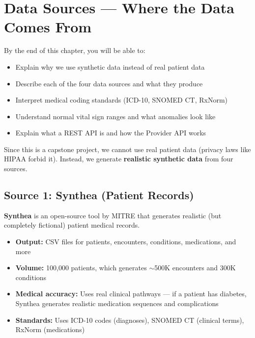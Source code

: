 \documentclass[12pt, a4paper, oneside]{report}
\begin{document}
\chapter{Data Sources --- Where the Data Comes From}
\label{ch:datasources}

\begin{objectivebox}
By the end of this chapter, you will be able to:
\begin{itemize}
    \item Explain why we use synthetic data instead of real patient data
    \item Describe each of the four data sources and what they produce
    \item Interpret medical coding standards (ICD-10, SNOMED CT, RxNorm)
    \item Understand normal vital sign ranges and what anomalies look like
    \item Explain what a REST API is and how the Provider API works
\end{itemize}
\end{objectivebox}

Since this is a capstone project, we cannot use real patient data (privacy laws like HIPAA forbid it). Instead, we generate \textbf{realistic synthetic data} from four sources.

\section{Source 1: Synthea (Patient Records)}

\textbf{Synthea} is an open-source tool by MITRE that generates realistic (but completely fictional) patient medical records.

\begin{itemize}
    \item \textbf{Output:} CSV files for patients, encounters, conditions, medications, and more
    \item \textbf{Volume:} 100,000 patients, which generates $\sim$500K encounters and 300K conditions
    \item \textbf{Medical accuracy:} Uses real clinical pathways --- if a patient has diabetes, Synthea generates realistic medication sequences and complications
    \item \textbf{Standards:} Uses ICD-10 codes (diagnoses), SNOMED CT (clinical terms), RxNorm (medications)
\end{itemize}
\end{document}
